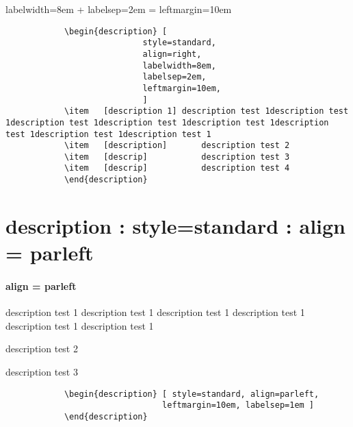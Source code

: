 			labelwidth=8em + labelsep=2em = leftmargin=10em

		\begin{mdframed}[style=code_document, frametitle={code}]
			\begin{verbatim}
			\begin{description}	[
							style=standard, 
							align=right,
							labelwidth=8em,
							labelsep=2em,
							leftmargin=10em,
							]
			\item	[description 1]	description test 1description test 1description test 1description test 1description test 1description test 1description test 1description test 1
			\item	[description]		description test 2
			\item	[descrip]			description test 3
			\item	[descrip]			description test 4
			\end{description}
			\end{verbatim}
		\end{mdframed}


	\section{description : style=standard : align = parleft}

			\paragraph{ align = parleft }
			\begin{description}	[
							style=standard, 
							align=parleft,
							leftmargin=10em,
							labelsep=1em
							]
			\item	[description1]		description test 1 description test 1 description test 1 description test 1 description test 1 description test 1
			\item	[description]		description test 2
			\item	[descrip]			description test 3
			\end{description}


		\begin{mdframed}[style=code_document, frametitle={code}]
			\begin{verbatim}
			\begin{description}	[ style=standard, align=parleft, 
								leftmargin=10em, labelsep=1em ]
			\end{description}
			\end{verbatim}
		\end{mdframed}

